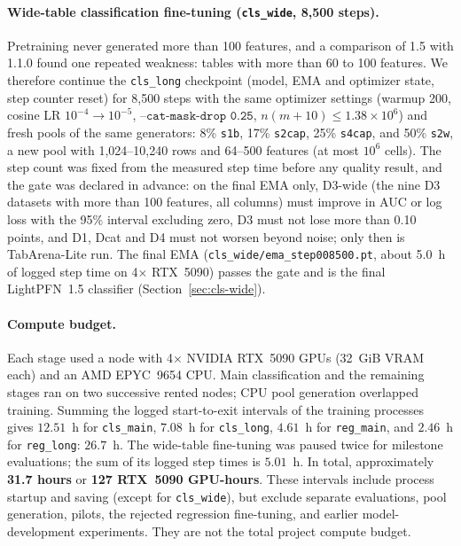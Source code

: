 \documentclass[11pt]{article}
\begin{document}
\paragraph{Wide-table classification fine-tuning (\texttt{cls\_wide}, 8,500 steps).}
Pretraining never generated more than 100 features, and a comparison of 1.5 with 1.1.0 found one repeated weakness: tables with more than 60 to 100 features. %
We therefore continue the \texttt{cls\_long} checkpoint (model, EMA and optimizer state, step counter reset) for 8,500 steps with the same optimizer settings (warmup 200, cosine LR $10^{-4}\to 10^{-5}$, $\texttt{--cat-mask-drop 0.25}$, $n(m+10)\le1.38\times10^6$) and fresh pools of the same generators: 8\% \texttt{s1b}, 17\% \texttt{s2cap}, 25\% \texttt{s4cap}, and 50\% \texttt{s2w}, a new pool with 1,024--10,240 rows and 64--500 features (at most $10^6$ cells). The step count was fixed from the measured step time before any quality result, and the gate was declared in advance: on the final EMA only, D3-wide (the nine D3 datasets with more than 100 features, all columns) must improve in AUC or log loss with the 95\% interval excluding zero, D3 must not lose more than 0.10 points, and D1, Dcat and D4 must not worsen beyond noise; only then is TabArena-Lite run. %
The final EMA (\texttt{cls\_wide/ema\_step008500.pt}, about 5.0~h of logged step time on 4$\times$ RTX~5090) passes the gate and is the final LightPFN~1.5 classifier (Section~\ref{sec:cls-wide}).

\paragraph{Compute budget.}
Each stage used a node with 4$\times$ NVIDIA RTX~5090 GPUs (32~GiB VRAM each) and an AMD EPYC~9654 CPU. Main classification and the remaining stages ran on two successive rented nodes; CPU pool generation overlapped training. %
Summing the logged start-to-exit intervals of the training processes gives $12.51$~h for \texttt{cls\_main}, $7.08$~h for \texttt{cls\_long}, $4.61$~h for \texttt{reg\_main}, and $2.46$~h for \texttt{reg\_long}: $26.7$~h. The wide-table fine-tuning was paused twice for milestone evaluations; the sum of its logged step times is $5.01$~h. In total, approximately \textbf{31.7 hours} or \textbf{127 RTX~5090 GPU-hours}. These intervals include process startup and saving (except for \texttt{cls\_wide}), but exclude separate evaluations, pool generation, pilots, the rejected regression fine-tuning, and earlier model-development experiments. They are not the total project compute budget. %
\end{document}
